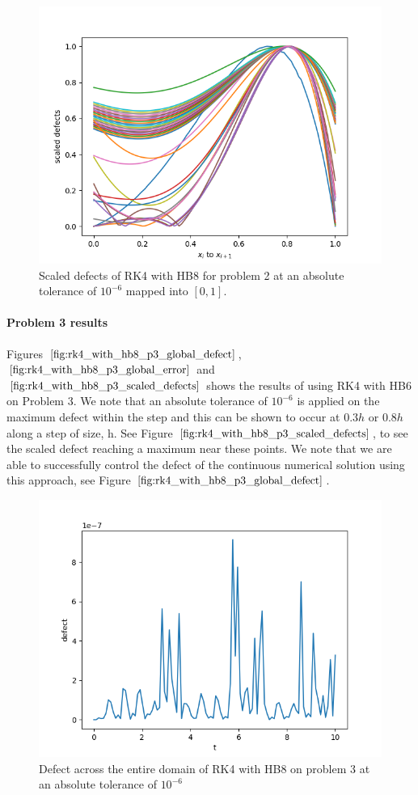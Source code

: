 \begin{figure}[H]
\centering
\includegraphics[width=0.7\linewidth]{./figures/rk4_with_hb8_p2_scaled_defects}
\caption{Scaled defects of RK4 with HB8 for problem 2 at an absolute tolerance of $10^{-6}$ mapped into $[0, 1]$.}
\label{fig:rk4_with_hb8_p2_scaled_defects}
\end{figure}

\paragraph{Problem 3 results}
Figures $\ref{fig:rk4_with_hb8_p3_global_defect}$, $\ref{fig:rk4_with_hb8_p3_global_error}$ and $\ref{fig:rk4_with_hb8_p3_scaled_defects}$ shows the results of using RK4 with HB6 on Problem 3. 
We note that an absolute tolerance of $10^{-6}$ is applied on the maximum defect within the step and this can be shown to occur at $0.3h$ or $0.8h$ along a step of size, h.  See Figure $\ref{fig:rk4_with_hb8_p3_scaled_defects}$, to see the scaled defect reaching a maximum near these points. We note that we are able to successfully control the defect of the continuous numerical solution using this approach, see Figure $\ref{fig:rk4_with_hb8_p3_global_defect}$. 

\begin{figure}[H]
\centering
\includegraphics[width=0.7\linewidth]{./figures/rk4_with_hb8_p3_global_defect}
\caption{Defect across the entire domain of RK4 with HB8 on problem 3 at an absolute tolerance of $10^{-6}$}
\label{fig:rk4_with_hb8_p3_global_defect}
\end{figure}

